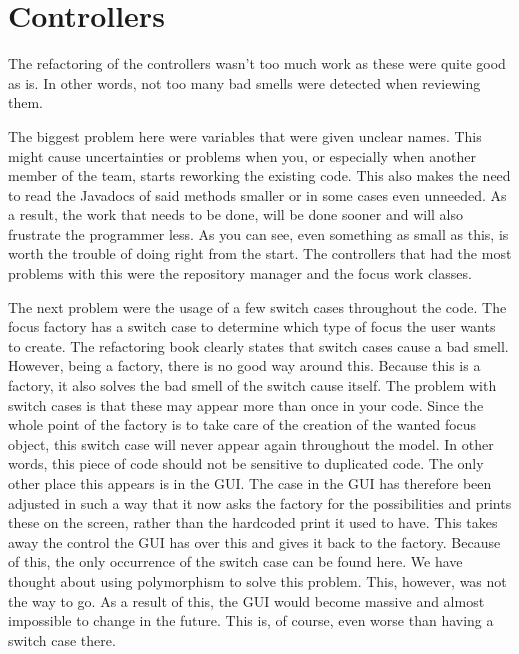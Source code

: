 



\maakvoorblad

\newpage
\thispagestyle{empty}
\mbox{}

\newpage
\maakvoorblad

\newpage

\tableofcontents

\newpage

\section{Controllers}
The refactoring of the controllers wasn't too much work as these were quite good as is. In other words, not too many bad smells were detected when reviewing them.

The biggest problem here were variables that were given unclear names. This might cause uncertainties or problems when you, or especially when another member of the team, starts reworking the existing code. This also makes the need to read the Javadocs of said methods smaller or in some cases even unneeded. As a result, the work that needs to be done, will be done sooner and will also frustrate the programmer less. As you can see, even something as small as this, is worth the trouble of doing right from the start. 
The controllers that had the most problems with this were the repository manager and the focus work classes.

The next problem were the usage of a few switch cases throughout the code. The focus factory has a switch case to determine which type of focus the user wants to create. The refactoring book clearly states that switch cases cause a bad smell. However, being a factory, there is no good way around this. Because this is a factory, it also solves the bad smell of the switch cause itself. The problem with switch cases is that these may appear more than once in your code. Since the whole point of the factory is to take care of the creation of the wanted focus object, this switch case will never appear again throughout the model.  In other words, this piece of code should not be sensitive to duplicated code. The only other place this appears is in the GUI. The case in the GUI has therefore been adjusted in such a way that it now asks the factory for the possibilities and prints these on the screen, rather than the hardcoded print it used to have. This takes away the control the GUI has over this and gives it back to the factory. Because of this, the only occurrence of the switch case can be found here. 
We have thought about using polymorphism to solve this problem. This, however, was not the way to go. As a result of this, the GUI would become massive and almost impossible to change in the future. This is, of course, even worse than having a switch case there.

